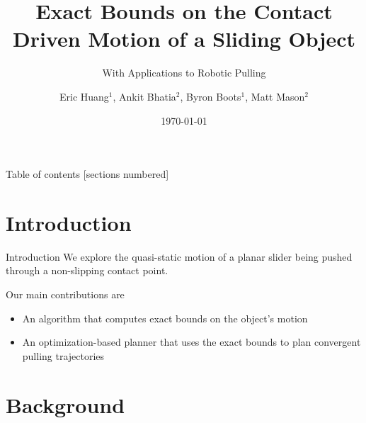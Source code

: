 \documentclass[10pt]{beamer}
\title{Exact Bounds on the Contact Driven Motion of a Sliding Object}
\subtitle{With Applications to Robotic Pulling}
\date{\today}
\author{Eric Huang$^1$, Ankit Bhatia$^2$, Byron Boots$^1$, Matt Mason$^2$}
\institute{$^1$Georgia Institute of Technology, $^2$Carnegie Mellon University}
\begin{document}
\maketitle

\begin{frame}{Table of contents}
  [sections numbered]
  \tableofcontents[hideallsubsections]
\end{frame}

\section{Introduction}

\begin{frame}{Introduction}
  We explore the quasi-static motion of a planar slider being pushed
  through a non-slipping contact point.\vspace{3mm}

  Our main contributions are
  \begin{itemize}
  \item An algorithm that computes exact bounds on the object's
    motion
  \item An optimization-based planner that uses the exact bounds to
    plan convergent pulling trajectories
  \end{itemize}
\end{frame}

\section{Background}
\end{document}
